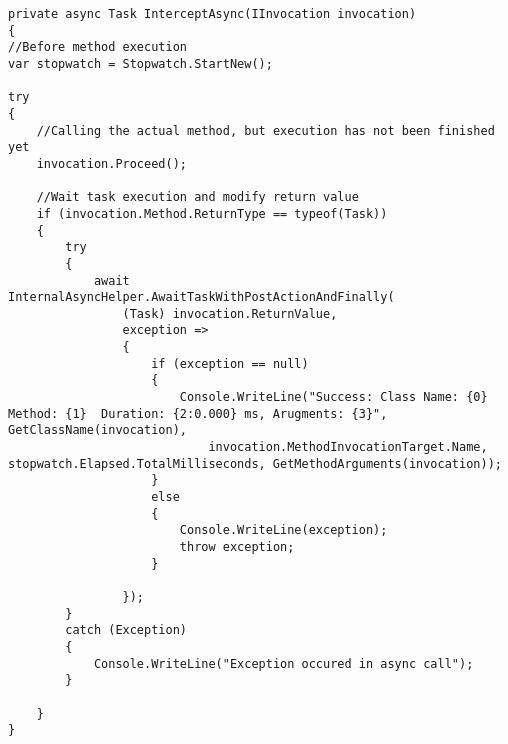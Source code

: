 \begin{lstlisting}[language={[Sharp]C}, caption={Interceptor logger logic implementation}, captionpos=b,label={lst:interceptor}]
private async Task InterceptAsync(IInvocation invocation)
{
//Before method execution
var stopwatch = Stopwatch.StartNew();

try
{
    //Calling the actual method, but execution has not been finished yet
    invocation.Proceed();

    //Wait task execution and modify return value
    if (invocation.Method.ReturnType == typeof(Task))
    {
        try
        {
            await InternalAsyncHelper.AwaitTaskWithPostActionAndFinally(
                (Task) invocation.ReturnValue,
                exception =>
                {
                    if (exception == null)
                    {
                        Console.WriteLine("Success: Class Name: {0} Method: {1}  Duration: {2:0.000} ms, Arugments: {3}", GetClassName(invocation),
                            invocation.MethodInvocationTarget.Name, stopwatch.Elapsed.TotalMilliseconds, GetMethodArguments(invocation));
                    }
                    else
                    {
                        Console.WriteLine(exception);
                        throw exception;
                    }
                    
                });
        }
        catch (Exception)
        {
            Console.WriteLine("Exception occured in async call");
        }
        
    }
}
\end{lstlisting}            
